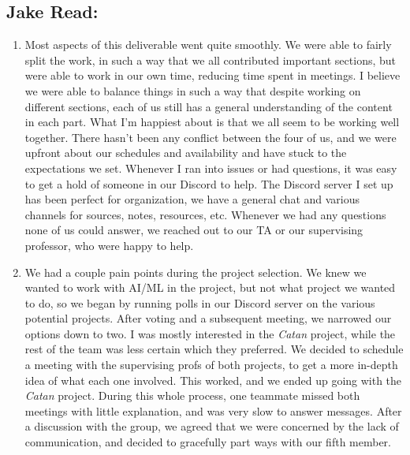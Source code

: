 \documentclass{article}
\begin{document}
%

\subsection*{Jake Read:}\label{subsec:jake-read-reflection}
\begin{enumerate}
    \item
        Most aspects of this deliverable went quite smoothly.
        We were able to fairly split the work, in such a way that we all contributed important sections, but were able to work in our own time, reducing time spent in meetings.
        I believe we were able to balance things in such a way that despite working on different sections, each of us still has a general understanding of the content in each part.
        What I'm happiest about is that we all seem to be working well together.
        There hasn't been any conflict between the four of us, and we were upfront about our schedules and availability and have stuck to the expectations we set.
        Whenever I ran into issues or had questions, it was easy to get a hold of someone in our Discord to help.
        The Discord server I set up has been perfect for organization, we have a general chat and various channels for sources, notes, resources, etc.
        Whenever we had any questions none of us could answer, we reached out to our TA or our supervising professor, who were happy to help.

    \item
        We had a couple pain points during the project selection.
        We knew we wanted to work with AI/ML in the project, but not what project we wanted to do, so we began by running polls in our Discord server on the various potential projects.
        After voting and a subsequent meeting, we narrowed our options down to two.
        I was mostly interested in the \emph{Catan} project, while the rest of the team was less certain which they preferred.
        We decided to schedule a meeting with the supervising profs of both projects, to get a more in-depth idea of what each one involved.
        This worked, and we ended up going with the \emph{Catan} project.
        During this whole process, one teammate missed both meetings with little explanation, and was very slow to answer messages.
        After a discussion with the group, we agreed that we were concerned by the lack of communication, and decided to gracefully part ways with our fifth member.


\end{enumerate}
\end{document}
